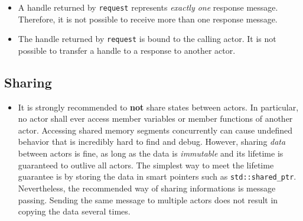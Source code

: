 \begin{itemize}

\item
A handle returned by \lstinline^request^ represents \emph{exactly one} response message.
Therefore, it is not possible to receive more than one response message.

\item
The handle returned by \lstinline^request^ is bound to the calling actor.
It is not possible to transfer a handle to a response to another actor.

\end{itemize}

\clearpage
\subsection{Sharing}

\begin{itemize}
\item It is strongly recommended to \textbf{not} share states between actors.
In particular, no actor shall ever access member variables or member functions of another actor.
Accessing shared memory segments concurrently can cause undefined behavior that is incredibly hard to find and debug.
However, sharing \textit{data} between actors is fine, as long as the data is \textit{immutable} and its lifetime is guaranteed to outlive all actors.
The simplest way to meet the lifetime guarantee is by storing the data in smart pointers such as \lstinline^std::shared_ptr^.
Nevertheless, the recommended way of sharing informations is message passing.
Sending the same message to multiple actors does not result in copying the data several times.
\end{itemize}
